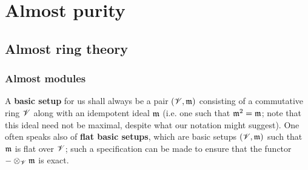 \chapter{Almost purity}    
    \section{Almost ring theory}
        \subsection{Almost modules}
            \begin{convention} \label{conv: basic_setups}
                A \textbf{basic setup} for us shall always be a pair $(\mathscr{V}, \mathfrak{m})$ consisting of a commutative ring $\mathscr{V}$ along with an idempotent ideal $\mathfrak{m}$ (i.e. one such that $\mathfrak{m}^2 = \mathfrak{m}$; note that this ideal need not be maximal, despite what our notation might suggest). One often speaks also of \textbf{flat basic setups}, which are basic setups $(\mathscr{V}, \mathfrak{m})$ such that $\mathfrak{m}$ is flat over $\mathscr{V}$; such a specification can be made to ensure that the functor $- \tensor_{\scrV} \m$ is exact.
            \end{convention}
            
